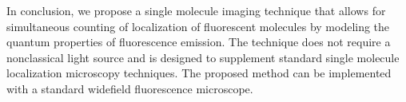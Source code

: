 \documentclass[a4paper, twocolumn, superscriptaddress,prl]{revtex4}  %
\begin{document}
In conclusion, we propose a single molecule imaging technique that allows for simultaneous counting of localization of fluorescent molecules by modeling the quantum properties of fluorescence emission. The technique does not require a nonclassical light source and is designed to supplement standard single molecule localization microscopy techniques. The proposed method can be implemented with a standard widefield fluorescence microscope.



 
\end{document}
